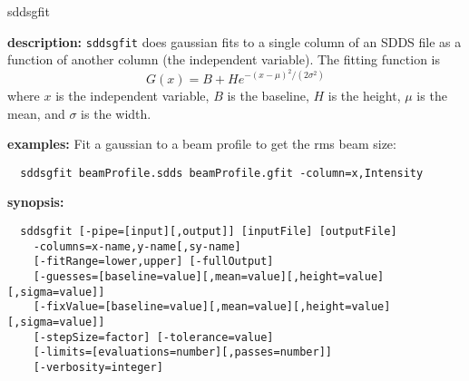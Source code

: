 \begin{sddsprog}{sddsgfit}
  \item \textbf{description:}
  \verb|sddsgfit| does gaussian fits to a single column of an SDDS file as a function of another column
  (the independent variable). The fitting function is
  \[
    G(x) = B + H e^{-(x-\mu)^2/(2\sigma^2)}
  \]
  where $x$ is the independent variable, $B$ is the baseline, $H$ is the height, $\mu$ is the mean, and
  $\sigma$ is the width.

  \item \textbf{examples:}
  Fit a gaussian to a beam profile to get the rms beam size:
  \begin{verbatim}
  sddsgfit beamProfile.sdds beamProfile.gfit -column=x,Intensity
  \end{verbatim}

  \item \textbf{synopsis:}
  \begin{verbatim}
  sddsgfit [-pipe=[input][,output]] [inputFile] [outputFile]
    -columns=x-name,y-name[,sy-name]
    [-fitRange=lower,upper] [-fullOutput]
    [-guesses=[baseline=value][,mean=value][,height=value][,sigma=value]]
    [-fixValue=[baseline=value][,mean=value][,height=value][,sigma=value]]
    [-stepSize=factor] [-tolerance=value]
    [-limits=[evaluations=number][,passes=number]]
    [-verbosity=integer]
  \end{verbatim}


\end{sddsprog}
